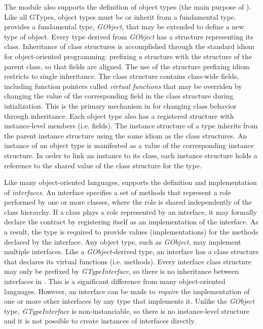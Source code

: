 \documentclass[article]{jss}
\begin{document}
The  module also supports the definition of object types (the main purpose of ). Like all GTypes, object types must be or inherit from a fundamental type.  provides a fundamental type, \emph{GObject}, that may be extended to define a new type of object. Every type derived from \emph{GObject} has a  structure representing its class. Inheritance of class structures is accomplished through the standard  idiom for object-oriented programming: prefixing a structure with the structure of the parent class, so that fields are aligned. The use of the structure prefixing idiom restricts  to single inheritance. The class structure contains class-wide fields, including function pointers called \emph{virtual functions} that may be overriden by changing the value of the corresponding field in the class structure during intialization. This is the primary mechanism in  for changing class
behavior through inheritance. Each object type also has a registered structure with instance-level members (i.e. fields). The instance structure of a type inherits from the parent instance structure using the same idiom as the class structures. An instance of an object type is manifested as a value of the corresponding instance structure. In order to link an instance to its class, each instance structure holds a reference to the shared value of the class structure for the type.

Like many object-oriented languages,  supports the
definition and implementation of \emph{interfaces}. An interface
specifies a set of methods that represent a role performed by one or
more classes, where the role is shared independently of the class
hierarchy. If a class plays a role represented by an interface, it may
formally declare the contract by registering itself as an
implementation of the interface. As a result, the type is required to
provide values (implementations) for the methods declared by the
interface. Any object type, such as \emph{GObject},
may implement multiple interfaces. Like a \emph{GObject}-derived type, an interface has a class structure that declares its virtual functions (i.e. methods). Every interface class structure may only be prefixed by \emph{GTypeInterface}, so there is no inheritance between interfaces in . This is a significant difference from many object-oriented languages. However, an interface can be made to \emph{require} the implementation of one or more other interfaces by any type that implements it. Unlike the \emph{GObject} type, \emph{GTypeInterface} is non-instanciable, so there is no instance-level structure and it is not possible to create instances of interfaces directly.
\end{document}
